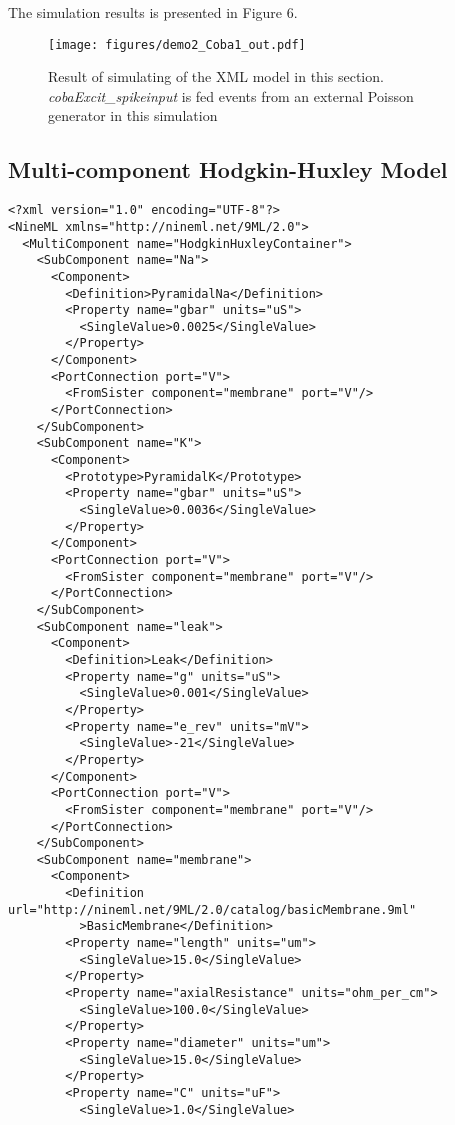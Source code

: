 \documentclass[draftspec]{ninemlspec}
\begin{document}
The simulation results is presented in Figure 6.
\begin{figure}[htb!]
\center
\texttt{[image: figures/demo2\_Coba1\_out.pdf]}
\protect\caption{Result of simulating of the XML model in this section.
\emph{cobaExcit\_spikeinput} is fed events from an external Poisson generator
in this simulation}
\label{fig:EX2_Output}
\end{figure}

\clearpage
\subsection{Multi-component Hodgkin-Huxley Model}

\begin{lstlisting}
<?xml version="1.0" encoding="UTF-8"?>
<NineML xmlns="http://nineml.net/9ML/2.0">
  <MultiComponent name="HodgkinHuxleyContainer">
    <SubComponent name="Na">
      <Component>
        <Definition>PyramidalNa</Definition>
        <Property name="gbar" units="uS">
          <SingleValue>0.0025</SingleValue>
        </Property>
      </Component>
      <PortConnection port="V">
        <FromSister component="membrane" port="V"/>
      </PortConnection>
    </SubComponent>
    <SubComponent name="K">
      <Component>
        <Prototype>PyramidalK</Prototype>
        <Property name="gbar" units="uS">
          <SingleValue>0.0036</SingleValue>
        </Property>
      </Component>
      <PortConnection port="V">
        <FromSister component="membrane" port="V"/>
      </PortConnection>
    </SubComponent>
    <SubComponent name="leak">
      <Component>
        <Definition>Leak</Definition>
        <Property name="g" units="uS">
          <SingleValue>0.001</SingleValue>
        </Property>
        <Property name="e_rev" units="mV">
          <SingleValue>-21</SingleValue>
        </Property>
      </Component>
      <PortConnection port="V">
        <FromSister component="membrane" port="V"/>
      </PortConnection>
    </SubComponent>
    <SubComponent name="membrane">
      <Component>
        <Definition url="http://nineml.net/9ML/2.0/catalog/basicMembrane.9ml"
          >BasicMembrane</Definition>
        <Property name="length" units="um">
          <SingleValue>15.0</SingleValue>
        </Property>
        <Property name="axialResistance" units="ohm_per_cm">
          <SingleValue>100.0</SingleValue>
        </Property>
        <Property name="diameter" units="um">
          <SingleValue>15.0</SingleValue>
        </Property>
        <Property name="C" units="uF">
          <SingleValue>1.0</SingleValue>

\end{lstlisting}
\end{document}
